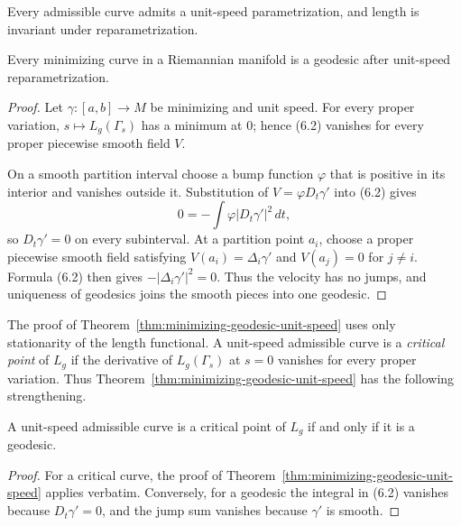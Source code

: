 Every admissible curve admits a unit-speed parametrization, and length is
invariant under reparametrization.

\begin{theorem}
\label{thm:minimizing-geodesic-unit-speed}


Every minimizing curve in a Riemannian manifold is a geodesic after
unit-speed reparametrization.
\end{theorem}

\begin{proof}
\sketch
Let $\gamma:[a,b]\to M$ be minimizing and unit speed.  For every proper
variation, $s\mapsto L_g(\Gamma_s)$ has a minimum at $0$; hence (6.2)
vanishes for every proper piecewise smooth field $V$.

On a smooth partition interval choose a bump function $\varphi$ that is
positive in its interior and vanishes outside it.  Substitution of
$V=\varphi D_t\gamma'$ into (6.2) gives
\[
0=-\int\varphi|D_t\gamma'|^2\,dt,
\]
so $D_t\gamma'=0$ on every subinterval.  At a partition point $a_i$, choose
a proper piecewise smooth field satisfying
$V(a_i)=\Delta_i\gamma'$ and $V(a_j)=0$ for $j\ne i$.  Formula (6.2) then
gives $-|\Delta_i\gamma'|^2=0$.  Thus the velocity has no jumps, and uniqueness
of geodesics joins the smooth pieces into one geodesic.
\end{proof}

The proof of Theorem~\ref{thm:minimizing-geodesic-unit-speed} uses only
stationarity of the length functional.  A unit-speed admissible curve is a
\emph{critical point} of $L_g$ if the derivative of $L_g(\Gamma_s)$ at $s=0$
vanishes for every proper variation.  Thus
Theorem~\ref{thm:minimizing-geodesic-unit-speed} has the following
strengthening.

\begin{corollary}
\label{cor:critical-point-geodesic}


A unit-speed admissible curve is a critical point of $L_g$ if and only if it
is a geodesic.
\end{corollary}

\begin{proof}
\sketch
For a critical curve, the proof of
Theorem~\ref{thm:minimizing-geodesic-unit-speed} applies verbatim.  Conversely,
for a geodesic the integral in (6.2) vanishes because $D_t\gamma'=0$, and the
jump sum vanishes because $\gamma'$ is smooth.
\end{proof}

